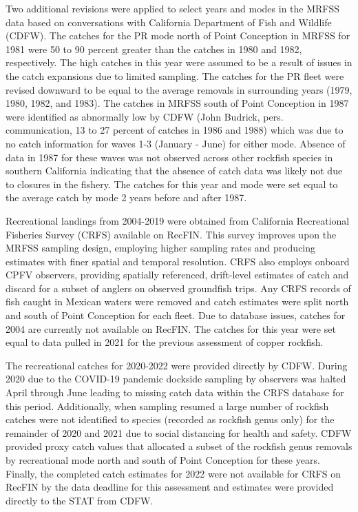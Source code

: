 \documentclass[
]{article}
\begin{document}
Two additional revisions were applied to select years and modes in the
MRFSS data based on conversations with California Department of Fish and
Wildlife (CDFW). The catches for the PR mode north of Point Conception
in MRFSS for 1981 were 50 to 90 percent greater than the catches in 1980
and 1982, respectively. The high catches in this year were assumed to be
a result of issues in the catch expansions due to limited sampling. The
catches for the PR fleet were revised downward to be equal to the
average removals in surrounding years (1979, 1980, 1982, and 1983). The
catches in MRFSS south of Point Conception in 1987 were identified as
abnormally low by CDFW (John Budrick, pers. communication, 13 to 27
percent of catches in 1986 and 1988) which was due to no catch
information for waves 1-3 (January - June) for either mode. Absence of
data in 1987 for these waves was not observed across other rockfish
species in southern California indicating that the absence of catch data
was likely not due to closures in the fishery. The catches for this year
and mode were set equal to the average catch by mode 2 years before and
after 1987.

Recreational landings from 2004-2019 were obtained from California
Recreational Fisheries Survey (CRFS) available on RecFIN. This survey
improves upon the MRFSS sampling design, employing higher sampling rates
and producing estimates with finer spatial and temporal resolution. CRFS
also employs onboard CPFV observers, providing spatially referenced,
drift-level estimates of catch and discard for a subset of anglers on
observed groundfish trips. Any CRFS records of fish caught in Mexican
waters were removed and catch estimates were split north and south of
Point Conception for each fleet. Due to database issues, catches for
2004 are currently not available on RecFIN. The catches for this year
were set equal to data pulled in 2021 for the previous assessment of
copper rockfish.

The recreational catches for 2020-2022 were provided directly by CDFW.
During 2020 due to the COVID-19 pandemic dockside sampling by observers
was halted April through June leading to missing catch data within the
CRFS database for this period. Additionally, when sampling resumed a
large number of rockfish catches were not identified to species
(recorded as rockfish genus only) for the remainder of 2020 and 2021 due
to social distancing for health and safety. CDFW provided proxy catch
values that allocated a subset of the rockfish genus removals by
recreational mode north and south of Point Conception for these years.
Finally, the completed catch estimates for 2022 were not available for
CRFS on RecFIN by the data deadline for this assessment and estimates
were provided directly to the STAT from CDFW.
\end{document}
